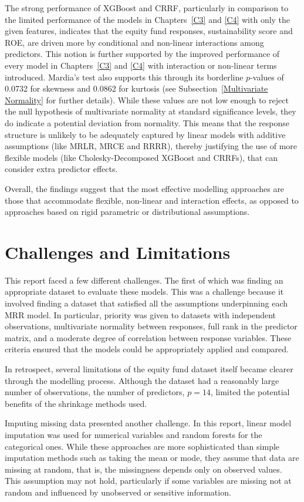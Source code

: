 \documentclass[11pt]{report} %
\begin{document}
The strong performance of XGBoost and CRRF, particularly in comparison to the limited performance of the models in Chapters~\ref{C3} and \ref{C4} with only the given features, indicates that the equity fund responses, sustainability score and ROE, are driven more by conditional and non-linear interactions among predictors. 
This notion is further supported by the improved performance of every model in Chapters~\ref{C3} and \ref{C4} with interaction or non-linear terms introduced. Mardia's test also supports this through its borderline $p$-values of 0.0732 for skewness and 0.0862 for kurtosis (see Subsection~\ref{Multivariate Normality} for further details). 
While these values are not low enough to reject the null hypothesis of multivariate normality at standard significance levels, they do indicate a potential deviation from normality. This means that the response structure is unlikely to be adequately captured by linear models with additive assumptions (like MRLR, MRCE and RRRR), thereby justifying the use of more flexible models (like Cholesky-Decomposed XGBoost and CRRFs), that can consider extra predictor effects.

Overall, the findings suggest that the most effective modelling approaches are those that accommodate flexible, non-linear and interaction effects, as opposed to approaches based on rigid parametric or distributional assumptions.

 
\section{Challenges and Limitations}
This report faced a few different challenges. The first of which was finding an appropriate dataset to evaluate these models. This was a challenge because it involved finding a dataset that satisfied all the assumptions underpinning each MRR model. In particular, priority was given to datasets with independent observations, multivariate normality between responses, full rank in the predictor matrix, and a moderate degree of correlation between response variables. These criteria ensured that the models could be appropriately applied and compared.

In retrospect, several limitations of the equity fund dataset itself became clearer through the modelling process. Although the dataset had a reasonably large number of observations, the number of predictors, $p = 14$, limited the potential benefits of the shrinkage methods used. 

\noindent Imputing missing data presented another challenge. In this report, linear model imputation was used for numerical variables and random forests for the categorical ones. While these approaches are more sophisticated than simple imputation methods such as taking the mean or mode, they assume that data are missing at random, that is, the missingness depends only on observed values. This assumption may not hold, particularly if some variables are missing not at random and influenced by unobserved or sensitive information. 
\end{document}
